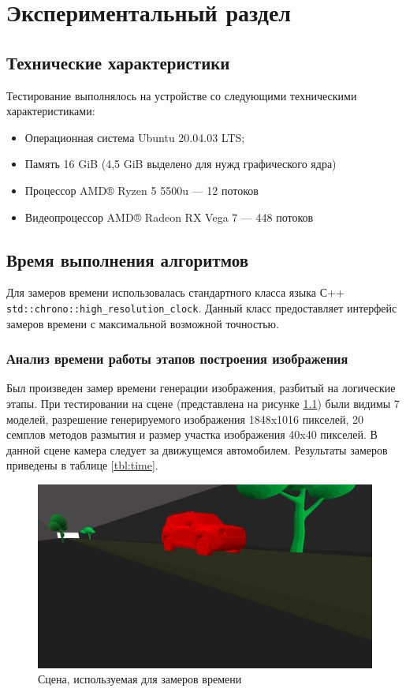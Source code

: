 \chapter{Экспериментальный раздел}
\label{cha:research}


\section{Технические характеристики}
Тестирование выполнялось на устройстве \cite{lenovo} со следующими техническими характеристиками:
\begin{itemize}
	\item Операционная система Ubuntu 20.04.03 LTS;
	\item Память 16 GiB (4,5 GiB выделено для нужд графического ядра)
	\item Процессор AMD® Ryzen 5 5500u --- 12 потоков
    \item Видеопроцессор AMD® Radeon RX Vega 7 --- 448 потоков
\end{itemize}

\section{Время выполнения алгоритмов}

Для замеров времени использовалась стандартного класса языка С++ \verb|std::chrono::high_resolution_clock|. Данный класс предоставляет интерфейс замеров времени с максимальной возможной точностью.

\subsection{Анализ времени работы этапов построения изображения}

Был произведен замер времени генерации изображения, разбитый на логические этапы. При тестировании на сцене (представлена на рисунке \ref{fig:scene_exp}) были видимы 7 моделей, разрешение генерируемого изображения 1848x1016 пикселей, 20 семплов методов размытия и размер участка изображения 40x40 пикселей. В данной сцене камера следует за движущемся автомобилем. Результаты замеров приведены в таблице \ref{tbl:time}. 


\begin{figure}[h]
    \centering
    \includegraphics[width=0.8\linewidth]{img/exp/s_1.png} 

    \caption{Сцена, используемая для замеров времени}
    \label{fig:scene_exp}
\end{figure} 


